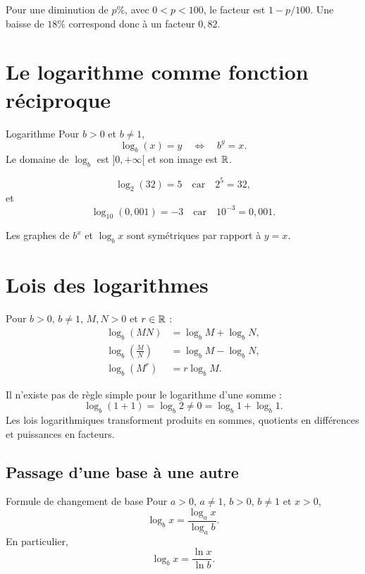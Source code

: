 Pour une diminution de $p\%$, avec $0<p<100$, le facteur est $1-p/100$. Une baisse de $18\%$ correspond donc à un facteur $0{,}82$.

\section{Le logarithme comme fonction réciproque}
\label{manual:section:06.02}

\begin{definition}{Logarithme}{}
Pour $b>0$ et $b\neq1$,
\[
\log_b(x)=y
\quad\Longleftrightarrow\quad
b^y=x.
\]
Le domaine de $\log_b$ est $]0,+\infty[$ et son image est $\mathbb{R}$.
\end{definition}

\begin{examplebox}
\[
\log_2(32)=5
\quad\text{car}\quad
2^5=32,
\]
et
\[
\log_{10}(0{,}001)=-3
\quad\text{car}\quad
10^{-3}=0{,}001.
\]
\end{examplebox}

Les graphes de $b^x$ et $\log_b x$ sont symétriques par rapport à $y=x$.

\section{Lois des logarithmes}
\label{manual:section:06.03}

Pour \(b>0\), \(b\ne1\), \(M,N>0\) et \(r\in\mathbb{R}\) :
\begin{align*}
\log_b(MN)&=\log_bM+\log_bN,\\
\log_b\left(\frac MN\right)&=\log_bM-\log_bN,\\
\log_b(M^r)&=r\log_bM.
\end{align*}

\begin{warningbox}
Il n'existe pas de règle simple pour le logarithme d'une somme :
\[
\log_b(1+1)=\log_b2\ne0=\log_b1+\log_b1.
\]
Les lois logarithmiques transforment produits en sommes, quotients en différences et puissances en facteurs.
\end{warningbox}

\subsection{Passage d'une base à une autre}

\begin{theorem}{Formule de changement de base}{}
Pour $a>0$, $a\neq1$, $b>0$, $b\neq1$ et $x>0$,
\[
\log_b x=\frac{\log_a x}{\log_a b}.
\]
En particulier,
\[
\log_bx=\frac{\ln x}{\ln b}.
\]
\end{theorem}

